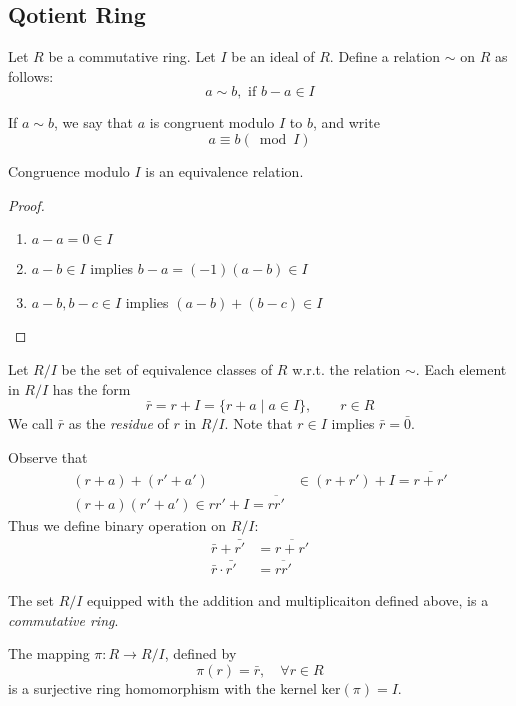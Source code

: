 \subsection{Qotient Ring}
Let $R$ be a commutative ring. Let $I$ be an ideal of $R$. Define a relation $\sim$ on $R$ as follows:
\[
a\sim b,\mbox{ if }b-a\in I
\]
\begin{definition}
If $a\sim b$, we say that $a$ is congruent modulo $I$ to $b$, and write
\[
a\equiv b(\bmod I)
\]
\end{definition}
\begin{proposition}
Congruence modulo $I$ is an equivalence relation.
\end{proposition}
\begin{proof}
\begin{enumerate}
\item
$a-a=0\in I$
\item
$a-b\in I$ implies $b-a=(-1)(a-b)\in I$
\item
$a-b,b-c\in I$ implies $(a-b)+(b-c)\in I$
\end{enumerate}
\end{proof}
\begin{definition}[Residue]
Let $R/I$ be the set of equivalence classes of $R$ w.r.t. the relation $\sim$. Each element in $R/I$ has the form
\[
\bar{r}=r+I=\{r+a\mid a\in I\},\qquad r\in R
\]
We call $\bar{r}$ as the \emph{residue} of $r$ in $R/I$. Note that $r\in I$ implies $\bar{r}=\bar{0}$.
\end{definition}
Observe that
\begin{align*}
(r+a)+(r'+a')&\in(r+r')+I=\overline{r+r'}\\
(r+a)(r'+a')\in rr'+I=\overline{rr'}
\end{align*}
Thus we define binary operation on $R/I$:
\begin{align*}
\bar{r}+\bar{r'}&=\overline{r+r'}\\
\bar r\cdot\bar{r'}&=\overline{rr'}
\end{align*}
\begin{proposition}
The set $R/I$ equipped with the addition and multiplicaiton defined above, is a \emph{commutative ring}.
\end{proposition}
\begin{proposition}
The mapping $\pi: R\to R/I$, defined by
\[
\pi(r)=\bar{r},\quad \forall r\in R
\]
 is a surjective ring homomorphism with the kernel $\mbox{ker}(\pi)=I$.
\end{proposition}

